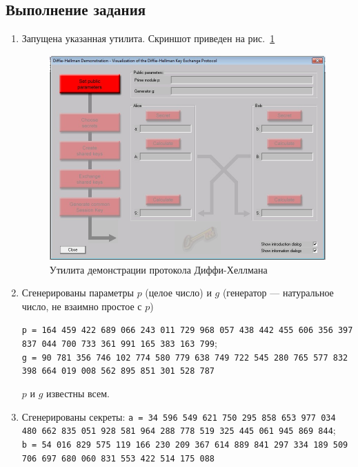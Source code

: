 \documentclass[a4paper, 14pt]{extarticle}
\begin{document}
\subsection{Выполнение задания}
\begin{enumerate}
    \item Запущена указанная утилита. Скриншот приведен на рис.~\ref{img:a:1}
        \begin{figure}[h]
            \centering
            \includegraphics[width=\textwidth]{img/S001.jpg}
            \caption{Утилита демонстрации протокола Диффи-Хеллмана}%
            \label{img:a:1}
        \end{figure}
        \FloatBarrier{}

    \item Сгенерированы параметры $p$ (целое число) и $g$ (генератор --- натуральное число, не взаимно простое с $p$)

        \texttt{p = 164 459 422 689 066 243 011 729 968 057 438 442 455 606 356 397 837 044 700 733 361 991 165 383 163 799};\\
        \texttt{g = 90 781 356 746 102 774 580 779 638 749 722 545 280 765 577 832 398 664 019 008 562 895 851 301 528 787}

        $p$ и $g$ известны всем.

    \item Сгенерированы секреты:
        \texttt{a = 34 596 549 621 750 295 858 653 977 034 480 662 835 051 928 581 964 288 778 519 325 445 061 945 869 844};\\
        \texttt{b = 54 016 829 575 119 166 230 209 367 614 889 841 297 334 189 509 706 697 680 060 831 553 422 514 175 088}


\end{enumerate}
\end{document}

